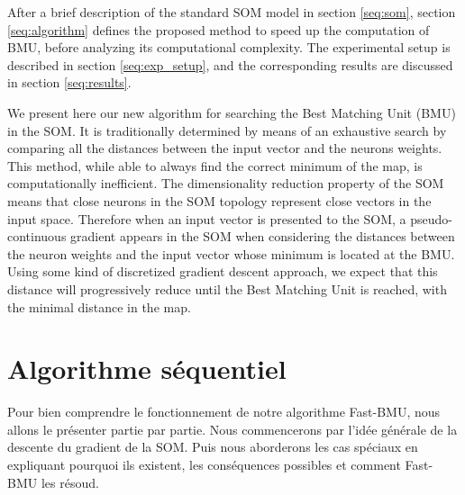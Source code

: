 	After a brief description of the standard SOM model in section \ref{seq:som}, section \ref{seq:algorithm} defines the proposed method to speed up the computation of BMU, before analyzing its computational complexity. The experimental setup is described in section \ref{seq:exp_setup}, 
	and the corresponding results are discussed in section \ref{seq:results}.

	We present here our new algorithm for searching the Best Matching Unit (BMU) in the SOM. It is traditionally determined by means of an exhaustive search by comparing all the distances between the input vector and the neurons weights. This method, while able to always find the correct minimum of the map, is computationally inefficient. The dimensionality reduction property of the SOM means that close neurons in the SOM topology represent close vectors in the input space. Therefore when an input vector is presented to the SOM, a pseudo-continuous gradient appears in the SOM when considering the distances between the neuron weights and the input vector whose minimum is located at the BMU. Using some kind of discretized gradient descent approach, we expect that this distance will progressively reduce until the Best Matching Unit is reached, with the minimal distance in the map. 

	\newpage

	\section{Algorithme séquentiel}

	Pour bien comprendre le fonctionnement de notre algorithme Fast-BMU, nous allons le présenter partie par partie. Nous commencerons par l'idée générale de la descente du gradient de la SOM. Puis nous aborderons les cas spéciaux en expliquant pourquoi ils existent, les conséquences possibles et comment Fast-BMU les résoud.

